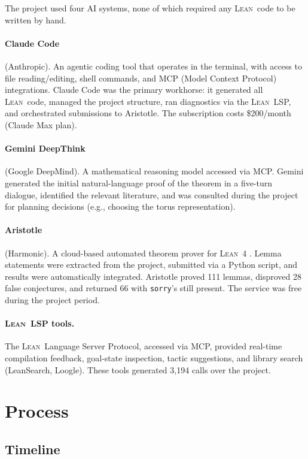 \documentclass[11pt]{article}
\newcommand{\lean}{\textsc{Lean}}
\newcommand{\sorry}{\texttt{sorry}}
\begin{document}
The project used four AI systems, none of which required any \lean\ code to be written by hand.

\paragraph{Claude Code} (Anthropic). An agentic coding tool that operates in the terminal, with access to file reading/editing, shell commands, and MCP (Model Context Protocol) integrations. Claude Code was the primary workhorse: it generated all \lean\ code, managed the project structure, ran diagnostics via the \lean\ LSP, and orchestrated submissions to Aristotle. The subscription costs \$200/month (Claude Max plan).

\paragraph{Gemini DeepThink} (Google DeepMind). A mathematical reasoning model accessed via MCP. Gemini generated the initial natural-language proof of the theorem in a five-turn dialogue, identified the relevant literature, and was consulted during the project for planning decisions (e.g., choosing the torus representation).

\paragraph{Aristotle} (Harmonic). A cloud-based automated theorem prover for \lean~4 \citep{aristotle2025}. Lemma statements were extracted from the project, submitted via a Python script, and results were automatically integrated. Aristotle proved 111 lemmas, disproved 28 false conjectures, and returned 66 with \sorry's still present. The service was free during the project period.

\paragraph{\lean\ LSP tools.} The \lean\ Language Server Protocol, accessed via MCP, provided real-time compilation feedback, goal-state inspection, tactic suggestions, and library search (LeanSearch, Loogle). These tools generated 3{,}194 calls over the project.

\section{Process}
\label{sec:process}

\subsection{Timeline}
\end{document}
